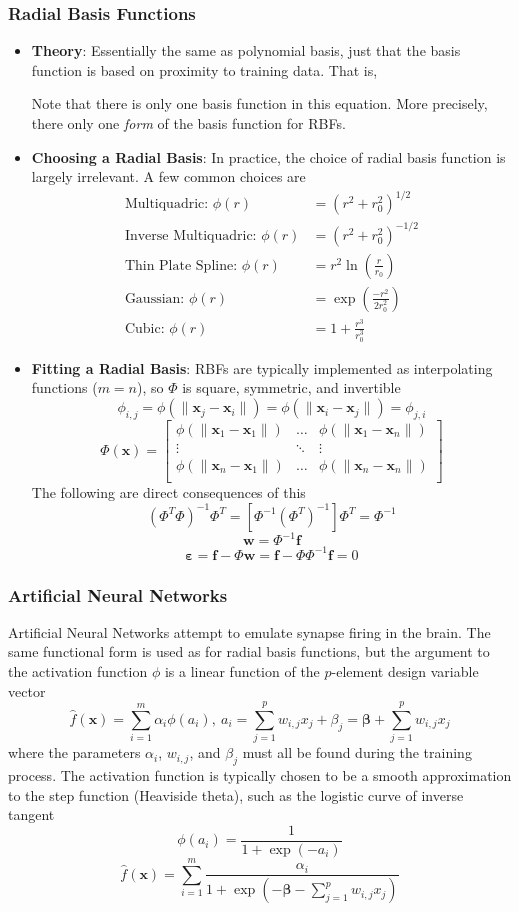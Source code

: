 \documentclass[11pt]{article}
\newcommand{\Item}[1]{\item \textbf{#1}:}
\newcommand{\CenteredBoxed}[1]{\begin{center}\boxed{#1}\end{center}}
\newcommand{\sumlim}[2]{\sum\limits_{#1}^{#2}}
\newcommand{\boldx}{\mathbf{x}}
\begin{document}
\subsubsection{Radial Basis Functions}
\begin{itemize}
\Item{Theory} Essentially the same as polynomial basis, just that the basis function is based on proximity to training data. That is,
\CenteredBoxed{\hat{f}(\boldx_j)=\sumlim{i}{n}w_i\phi(\|\boldx_j-\boldx_i\|)}
Note that there is only one basis function in this equation. More precisely, there only one \emph{form} of the basis function for RBFs.
\Item{Choosing a Radial Basis} In practice, the choice of radial basis function is largely irrelevant. A few common choices are
	\begin{align}
	\textrm{Multiquadric: }\phi(r)&=\left(r^2+r_0^2\right)^{1/2}\\
	\textrm{Inverse Multiquadric: }\phi(r)&=\left(r^2+r_0^2\right)^{-1/2}\\
	\textrm{Thin Plate Spline: }\phi(r)&=r^2\ln\left(\frac{r}{r_0}\right)\\
	\textrm{Gaussian: }\phi(r)&=\exp\left(\frac{-r^2}{2r_0^2}\right)\\
	\textrm{Cubic: }\phi(r)&=1+\frac{r^3}{r_0^3}
	\end{align}
\Item{Fitting a Radial Basis} RBFs are typically implemented as interpolating functions ($m=n$), so $\Phi$ is square, symmetric, and invertible
$$\phi_{i,j}=\phi(\|\boldx_j-\boldx_i\|)=\phi(\|\boldx_i-\boldx_j\|)=\phi_{j,i}$$
\[\Phi(\boldx) =  \begin{bmatrix}
\phi(\|\boldx_1-\boldx_1\|) & \dots & \phi(\|\boldx_1-\boldx_n\|)\\
\vdots & \ddots & \vdots\\
\phi(\|\boldx_n-\boldx_1\|) & \dots & \phi(\|\boldx_n-\boldx_n\|)\\
\end{bmatrix}\]
The following are direct consequences of this
$$(\Phi^T\Phi)^{-1}\Phi^T=\left[\Phi^{-1}(\Phi^T)^{-1}\right]\Phi^T=\Phi^{-1}$$
$$\bm{w}=\Phi^{-1}\bm{f}$$
$$\bm{\varepsilon}=\bm{f}-\Phi\bm{w}=\bm{f}-\Phi\Phi^{-1}\bm{f}=0$$
\end{itemize}
\subsubsection{Artificial Neural Networks}
Artificial Neural Networks attempt to emulate synapse firing in the brain. The same functional form is used as for radial basis functions, but the argument to the activation function $\phi$ is a linear function of the $p$-element design variable vector
$$\hat{f}(\boldx)=\sumlim{i=1}{m}\alpha_i\phi(a_i),\ a_i = \sumlim{j=1}{p}w_{i,j}x_j + \beta_j = \bm{\beta} + \sumlim{j=1}{p}w_{i,j}x_j$$
where the parameters $\alpha_i$, $w_{i,j}$, and $\beta_j$ must all be found during the training process. The activation function is typically chosen to be a smooth approximation to the step function (Heaviside theta), such as the logistic curve of inverse tangent
$$\phi(a_i)=\frac{1}{1+\exp(-a_i)}$$
$$\hat{f}(\boldx) = \sumlim{i=1}{m}\frac{\alpha_i}{1+\exp\left(-\bm{\beta}-\sumlim{j=1}{p}w_{i,j}x_j\right)}$$
\end{document}
